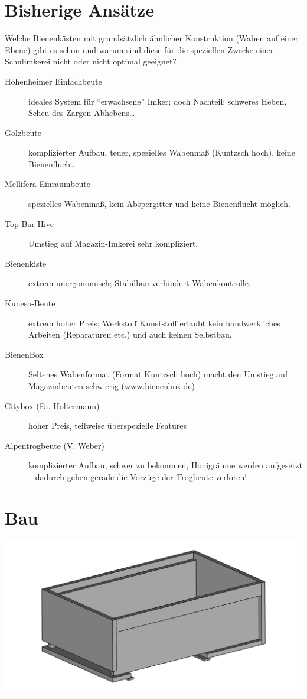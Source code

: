 \documentclass[12pt,a4paper,ngerman]{scrartcl}
\begin{document}
\section{Bisherige Ansätze}

Welche Bienenkästen mit grundsätzlich ähnlicher Konstruktion (Waben auf einer Ebene)
gibt es schon und warum sind diese für die speziellen Zwecke einer Schulimkerei
nicht oder nicht optimal geeignet?

\begin{description}
\item[Hohenheimer Einfachbeute] ideales System für \enquote{erwachsene} Imker;
  doch Nachteil: schweres Heben, Scheu des Zargen-Abhebens\ldots
\item[Golzbeute] komplizierter Aufbau, teuer, spezielles Wabenmaß (Kuntzsch hoch), keine Bienenflucht.
\item[Mellifera Einraumbeute] spezielles Wabenmaß, kein Abspergitter und keine Bienenflucht möglich.
\item[Top-Bar-Hive] Umstieg auf Magazin-Imkerei sehr kompliziert.
\item[Bienenkiste] extrem unergonomisch; Stabilbau verhindert Wabenkontrolle.
\item[Kunesa-Beute] extrem hoher Preis; Werkstoff Kunststoff erlaubt kein handwerkliches Arbeiten
  (Reparaturen etc.) und auch keinen Selbstbau.
\item[BienenBox] Seltenes Wabenformat (Format Kuntzsch hoch) macht den Umstieg auf Magazinbeuten schwierig
  (www.bienenbox.de)
\item[Citybox (Fa. Holtermann)] hoher Preis, teilweise überspezielle Features
\item[Alpentrogbeute (V. Weber)] komplizierter Aufbau, schwer zu bekommen, Honigräume werden aufgesetzt --
  dadurch gehen gerade die Vorzüge der Trogbeute verloren!
\end{description}


\section{Bau}


\includegraphics[width=\textwidth]{ansicht1}
\end{document}
